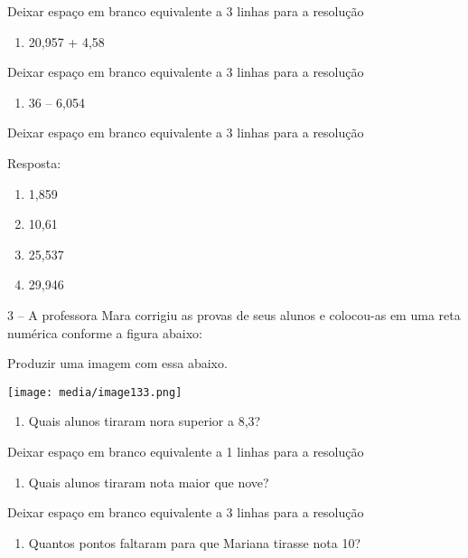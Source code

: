 Deixar espaço em branco equivalente a 3 linhas para a resolução

\begin{enumerate}
\def\labelenumi{\alph{enumi})}
\item
  20,957 + 4,58
\end{enumerate}

Deixar espaço em branco equivalente a 3 linhas para a resolução

\begin{enumerate}
\def\labelenumi{\alph{enumi})}
\item
  36 -- 6,054
\end{enumerate}

Deixar espaço em branco equivalente a 3 linhas para a resolução

Resposta:

\begin{enumerate}
\def\labelenumi{\alph{enumi})}
\item
  1,859
\item
  10,61
\item
  25,537
\item
  29,946
\end{enumerate}

3 -- A professora Mara corrigiu as provas de seus alunos e colocou-as em
uma reta numérica conforme a figura abaixo:

Produzir uma imagem com essa abaixo.

\texttt{[image: media/image133.png]}

\begin{enumerate}
\def\labelenumi{\alph{enumi})}
\item
  Quais alunos tiraram nora superior a 8,3?
\end{enumerate}

Deixar espaço em branco equivalente a 1 linhas para a resolução

\begin{enumerate}
\def\labelenumi{\alph{enumi})}
\item
  Quais alunos tiraram nota maior que nove?
\end{enumerate}

Deixar espaço em branco equivalente a 3 linhas para a resolução

\begin{enumerate}
\def\labelenumi{\alph{enumi})}
\item
  Quantos pontos faltaram para que Mariana tirasse nota 10?
\end{enumerate}


